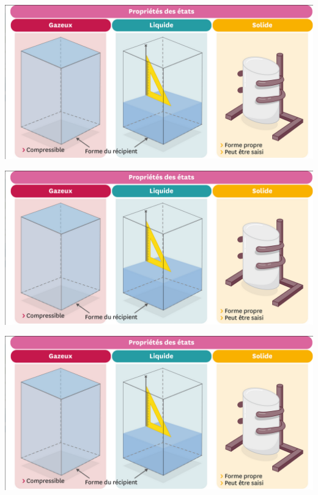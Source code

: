 \documentclass[12pt,a4paper]{article}
\begin{document}
	
\graphicspath{{./img/}}	

\begin{center}
	\includegraphics[scale=0.4]{etats}
\end{center}

\begin{center}
	\includegraphics[scale=0.4]{etats}
\end{center}

\begin{center}
	\includegraphics[scale=0.4]{etats}
\end{center}
\end{document}
